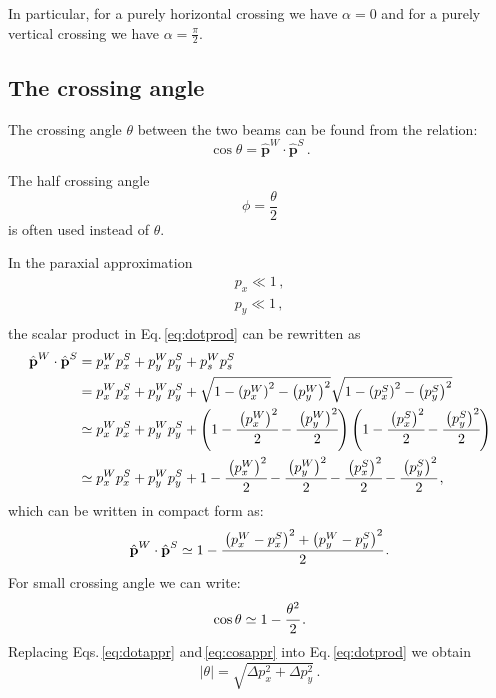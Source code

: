 In particular, for a purely horizontal crossing we have $\alpha=0$ and for a purely vertical crossing we have $\alpha=\frac{\pi}{2}$.

\subsection{The crossing angle}
The crossing angle $\theta$ between the two beams can be found from the relation:
\begin{equation}
\cos\theta=\hat{\textbf{p}}^W\cdot
\hat{\textbf{p}}^S
\, .
\label{eq:dotprod}
\end{equation}

The half crossing angle 
\begin{equation}
    \phi = \frac{\theta}{2}
\end{equation}
is often used instead of $\theta$.

In the paraxial approximation
\begin{align}
    p_x \ll 1 \, ,\\
    p_y \ll 1 \, ,\\
\end{align}
the scalar product in Eq.\,\eqref{eq:dotprod} can be rewritten as
\begin{align}
    \hat{\textbf{p}}^W\cdot
\hat{\textbf{p}}^S &=
p^W_{x}p^S_{x}+p^W_{y}p^S_{y}+p^W_{s}p^S_{s}
\nonumber\\
&= p^W_{x}p^S_{x}+p^W_{y}p^S_{y} +\sqrt{1 - \left(p^W_{x}\right)^2 - \left(p^W_{y}\right)^2}
\sqrt{1 - \left(p^S_{x}\right)^2 - \left(p^S_{y}\right)^2}
\nonumber\\
&\simeq  p^W_{x}p^S_{x}+p^W_{y}p^S_{y}
+\left(1 - \cfrac{\left(p^W_{x}\right)^2}{2} - \cfrac{\left(p^W_{y}\right)^2}{2}\right)
\left(1 - \cfrac{\left(p^S_{x}\right)^2}{2} - \cfrac{\left(p^S_{y}\right)^2}{2}\right)
\nonumber\\
&\simeq p^W_{x}p^S_{x}+p^W_{y}p^S_{y}
+ 1 - \cfrac{\left(p^W_{x}\right)^2}{2} - \cfrac{\left(p^W_{y}\right)^2}{2} - \cfrac{\left(p^S_{x}\right)^2}{2} - \cfrac{\left(p^S_{y}\right)^2}{2}
\, ,
\end{align}
which can be written in compact form as:
\begin{equation}
\hat{\textbf{p}}^W\cdot
\hat{\textbf{p}}^S
\simeq
1 - \cfrac{
\left(p^W_{x} - p^S_{x}\right)^2 + 
\left(p^W_{y} - p^S_{y}\right)^2}{2}
\, .
\label{eq:dotappr}
\end{equation}
For small crossing angle we can write:
\begin{equation}
    \cos \theta \simeq 1-\cfrac{\theta^2}{2} \, .
    \label{eq:cosappr}
\end{equation}
Replacing Eqs.\,\eqref{eq:dotappr} and\,\eqref{eq:cosappr} into Eq.\,\eqref{eq:dotprod} we obtain
\begin{equation}
    \left| \theta \right| = 
    \sqrt{\Delta p_x^2 + \Delta p_y^2} \, .
\end{equation}

